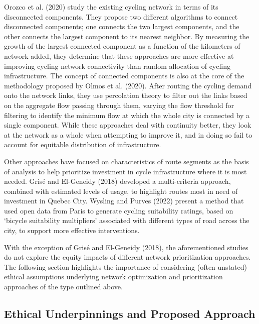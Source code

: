 \documentclass[
]{article}
\begin{document}
Orozco et al. (2020) study the existing cycling network in terms of its disconnected components.
They propose two different algorithms to connect disconnected components; one connects the two largest components, and the other connects the largest component to its nearest neighbor.
By measuring the growth of the largest connected component as a function of the kilometers of network added, they determine that these approaches are more effective at improving cycling network connectivity than random allocation of cycling infrastructure.
The concept of connected components is also at the core of the methodology proposed by Olmos et al. (2020).
After routing the cycling demand onto the network links, they use percolation theory to filter out the links based on the aggregate flow passing through them, varying the flow threshold for filtering to identify the minimum flow at which the whole city is connected by a single component.
While these approaches deal with continuity better, they look at the network as a whole when attempting to improve it, and in doing so fail to account for equitable distribution of infrastructure.

Other approaches have focused on characteristics of route segments as the basis of analysis to help prioritize investment in cycle infrastructure where it is most needed.
Grisé and El-Geneidy (2018) developed a multi-criteria approach, combined with estimated levels of usage, to highlight routes most in need of investment in Quebec City.
Wysling and Purves (2022) present a method that used open data from Paris to generate cycling suitability ratings, based on `bicycle suitability multipliers' associated with different types of road across the city, to support more effective interventions.

With the exception of Grisé and El-Geneidy (2018), the aforementioned studies do not explore the equity impacts of different network prioritization approaches.
The following section highlights the importance of considering (often unstated) ethical assumptions underlying network optimization and prioritization approaches of the type outlined above.

\hypertarget{ethical-underpinnings-and-proposed-approach}{%
\subsection{Ethical Underpinnings and Proposed Approach}\label{ethical-underpinnings-and-proposed-approach}}
\end{document}
